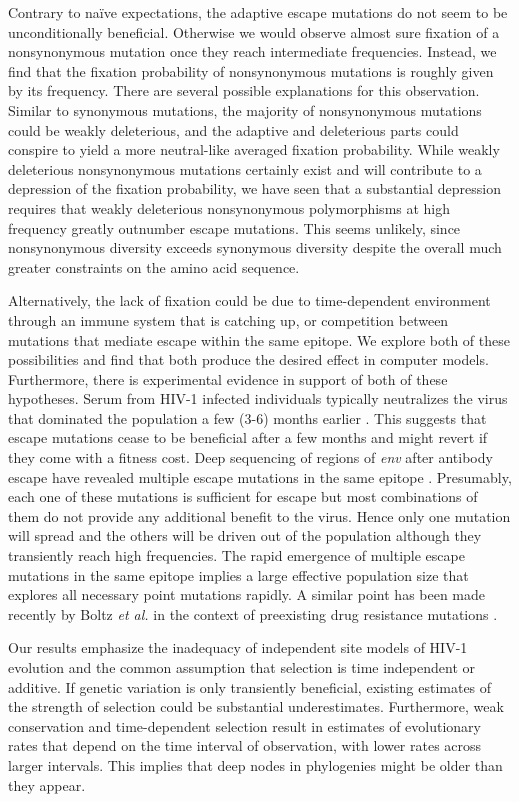 \documentclass[10pt]{article}
\newcommand{\env}{\textit{env}}
\begin{document}
Contrary to na\"ive expectations, the adaptive escape mutations do not seem to
be unconditionally beneficial. Otherwise we would observe almost sure fixation
of a nonsynonymous mutation once they reach intermediate frequencies. Instead, we
find that the fixation probability of nonsynonymous mutations is roughly given
by its frequency. There are several possible explanations for this observation.
Similar to synonymous mutations, the majority of nonsynonymous mutations could
be weakly deleterious, and the adaptive and deleterious parts could conspire to yield a
more neutral-like averaged fixation probability. While weakly deleterious 
nonsynonymous mutations certainly exist and will contribute to a depression of the
fixation probability, we have seen that a substantial depression requires that
weakly deleterious nonsynonymous polymorphisms at high frequency greatly 
outnumber escape mutations. This seems unlikely, since nonsynonymous diversity
exceeds synonymous diversity despite the overall much greater constraints on
the amino acid sequence. 

Alternatively, the lack of fixation could be due to time-dependent environment
through an immune system that is catching up, or competition between mutations
that mediate escape within the same epitope. We explore both of these
possibilities and find that both produce the desired effect in computer models. Furthermore, there
is experimental evidence in support of both of these hypotheses. Serum from HIV-1
infected individuals typically neutralizes the virus that dominated the
population a few (3-6) months earlier \cite{richman_rapid_2003}. This suggests that
escape mutations cease to be beneficial after a few months and might revert if
they come with a fitness cost. Deep sequencing of regions of \env{} after
antibody escape have revealed multiple escape mutations in the same epitope
\cite{moore_limited_2009, bar_early_2012}. Presumably, each one of these
mutations is sufficient for escape but most combinations of them do not provide
any additional benefit to the virus. Hence only one mutation will spread and the
others will be driven out of the population although they transiently reach high
frequencies. The rapid emergence of multiple escape mutations in the same
epitope implies a large effective population size that explores all necessary point
mutations rapidly. A similar point has been made recently by Boltz {\it et al.}
in the context of preexisting drug resistance mutations
\cite{boltz_ultrasensitive_2012}. 

Our results emphasize the inadequacy of independent site models of HIV-1 evolution
and the common assumption that selection is time independent or additive. 
If genetic variation is only transiently beneficial, existing estimates of the
strength of selection \cite{neher_recombination_2010,batorsky_estimate_2011}
could be substantial underestimates. Furthermore, weak conservation and
time-dependent selection result in estimates of evolutionary 
rates that depend on the time interval of observation, with lower rates across
larger intervals. This implies that deep nodes in phylogenies might be older than 
they appear.
\end{document}
